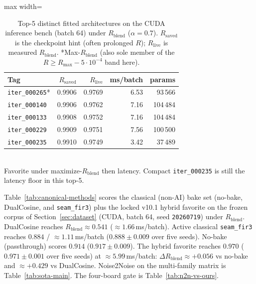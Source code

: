 \begin{table}[htbp]
  \centering
  \caption{Top-5 distinct fitted architectures on the CUDA inference bench (batch 64) under $R_{\mathrm{blend}}$ ($\alpha{=}0.7$).
  $R_{\mathrm{saved}}$ is the checkpoint hint (often prolonged $R$); $R_{\mathrm{live}}$ is measured $R_{\mathrm{blend}}$.
  *Max-$R_{\mathrm{blend}}$ (also sole member of the $R\ge R_{\max}-5\cdot10^{-4}$ band here).}
  \label{tab:top5}
  \setlength{\tabcolsep}{3pt}
  \begin{adjustbox}{max width=\columnwidth}
\begin{tabular}{@{}lrrrr@{}}
    \toprule
    Tag & $R_{\mathrm{saved}}$ & $R_{\mathrm{live}}$ & ms/batch & params \\
    \midrule
    \texttt{iter\_000265}* & 0.9906 & 0.9769 & 6.53 & 93\,566 \\
    \texttt{iter\_000140} & 0.9906 & 0.9762 & 7.16 & 104\,484 \\
    \texttt{iter\_000133} & 0.9908 & 0.9752 & 7.16 & 104\,484 \\
    \texttt{iter\_000229} & 0.9909 & 0.9751 & 7.56 & 100\,500 \\
    \texttt{iter\_000235} & 0.9910 & 0.9749 & 3.42 & 37\,489 \\
    \bottomrule
  \end{tabular}
\end{adjustbox}\\[0.4em]
  {\footnotesize *Favorite under maximize-$R_{\mathrm{blend}}$ then latency. Compact \texttt{iter\_000235} is still the latency floor in this top-5.}
\end{table}

\label{sec:classical-vs-favorite}
Table~\ref{tab:canonical-methods} scores the classical (non-AI) bake set (no-bake, DualCosine, and \texttt{seam\_fir3}) plus the locked v10.1 hybrid favorite on the frozen corpus of Section~\ref{sec:dataset} (CUDA, batch 64, seed \texttt{20260719}) under $R_{\mathrm{blend}}$.
DualCosine reaches $R_{\mathrm{blend}}\approx 0.541$ ($\approx 1.66$\,ms/batch).
Active classical \texttt{seam\_fir3} reaches $0.884$ / $\approx 1.11$\,ms/batch ($0.888\pm0.009$ over five seeds).
No-bake (passthrough) scores $0.914$ ($0.917\pm0.009$).
The hybrid favorite reaches $0.970$ ($0.971\pm0.001$ over five seeds) at $\approx 5.99$\,ms/batch:
$\Delta R_{\mathrm{blend}} \approx {+}0.056$ vs no-bake and $\approx {+}0.429$ vs DualCosine.
Noise2Noise on the multi-family matrix is Table~\ref{tab:sota-main}. The four-board gate is Table~\ref{tab:n2n-vs-ours}.

